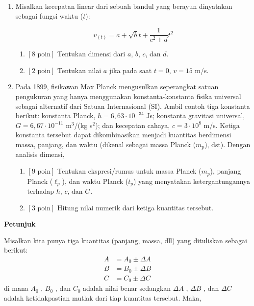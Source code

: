 \documentclass[12pt, a4paper]{article}\usepackage[utf8]{inputenc}
\theoremstyle{definition}
\theoremstyle{definition}
\begin{document}
\begin{enumerate}
		\item Misalkan kecepatan linear dari sebuah bandul yang berayun dinyatakan sebagai fungsi waktu ($t$):
		
		\begin{equation*}
			v_{(t)} = a + \sqrt{b}t + \frac{1}{c^2 + d}t^2
		\end{equation*}
	
		\begin{enumerate}[label=(\alph*)]
			\item $\left[ \text{8 poin} \right]$ Tentukan dimensi dari $a$, $b$, $c$, dan $d$.
			\item $\left[ \text{2 poin} \right]$ Tentukan nilai $a$ jika pada saat $t = 0$, $v = 15$ m/s.
		\end{enumerate}
		
		
		\item Pada 1899, fisikawan Max Planck mengusulkan seperangkat satuan pengukuran yang hanya menggunakan konstanta-konstanta fisika universal sebagai alternatif dari Satuan Internasional (SI). Ambil contoh tiga konstanta berikut: konstanta Planck, $h = 6,63 \cdot 10^{-34}$ Js; konstanta gravitasi universal, $G = 6,67 \cdot 10^{-11}$ m${}^3$/(kg s${}^2$); dan kecepatan cahaya, $c = 3 \cdot 10^{8}$ m/s. Ketiga konstanta tersebut dapat dikombinasikan menjadi kuantitas berdimensi massa, panjang, dan waktu (dikenal sebagai massa Planck ($m_p$), dst). Dengan analisis dimensi, 
		
		\begin{enumerate}[label=(\alph*)]
			\item $\left[ \text{9 poin} \right]$ Tentukan ekspresi/rumus untuk massa Planck ($m_p$), panjang Planck ($\ell_p$), dan waktu Planck ($t_p$) yang menyatakan ketergantungannya terhadap $h$, $c$, dan $G$.
			\item $\left[ \text{3 poin} \right]$ Hitung nilai numerik dari ketiga kuantitas tersebut.
		\end{enumerate}
		
	\end{enumerate}
	
	\pagebreak

	
	\begin{center}
		\textbf{\Large Petunjuk}
	\end{center}
	
	
	Misalkan kita punya tiga kuantitas (panjang, massa, dll) yang dituliskan sebagai berikut:
	\begin{align*}
		A&=A_{0} \pm \Delta A\\
		B&=B_{0} \pm \Delta B\\
		C&=C_{0} \pm \Delta C
	\end{align*}
	 di mana $\displaystyle A_{0}$ , $\displaystyle B_{0}$ , dan $\displaystyle C_{0}$  adalah nilai benar sedangkan $\displaystyle \Delta A$ , $\displaystyle \Delta B$ , dan $\displaystyle \Delta C$  adalah ketidakpastian mutlak dari tiap kuantitas tersebut. Maka,
	 
\end{document}
